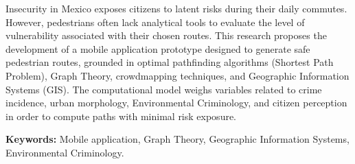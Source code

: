 
Insecurity in Mexico exposes citizens to latent risks during their daily commutes. However, pedestrians often lack analytical tools to evaluate the level of vulnerability associated with their chosen routes. This research proposes the development of a mobile application prototype designed to generate safe pedestrian routes, grounded in optimal pathfinding algorithms (Shortest Path Problem), Graph Theory, crowdmapping techniques, and Geographic Information Systems (GIS). The computational model weighs variables related to crime incidence, urban morphology, Environmental Criminology, and citizen perception in order to compute paths with minimal risk exposure.

\vspace{0.5cm}
\noindent\textbf{Keywords:} Mobile application, Graph Theory, Geographic Information Systems, Environmental Criminology.
